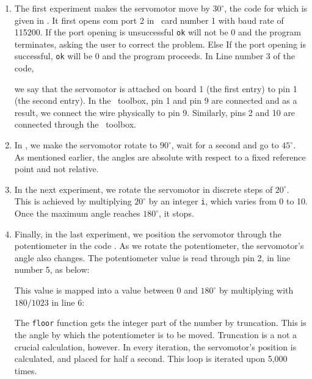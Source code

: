 \begin{enumerate}
  \item The first experiment makes the servomotor move by $30^\circ$,
        the code for which is given in .
        It first opens com port 2 in \arduino\ card number 1 with baud rate
        of 115200.  If the port opening is unsuccessful {\tt ok} will not be
        0 and the program terminates, asking the user to correct the
        problem.  Else If the port opening is successful, {\tt ok} will be 0
        and the program proceeds.  In Line number 3 of the code, \ie\
        
        we say that the servomotor is attached on board 1 (the first entry)
        to pin 1 (the second entry).  In the \scilab\ toolbox, pin 1 and pin
        9 are connected and as a result, we connect the wire physically to
        pin 9.  Similarly, pins 2 and 10 are connected through the
        \scilab\ toolbox.
        
  \item In , we make the servomotor rotate
        to $90^\circ$, wait for a second and go to $45^\circ$.  As mentioned
        earlier, the angles are absolute with respect to a fixed reference
        point and not relative.  
        
  \item In the next experiment, we rotate the servomotor in discrete
        steps of $20^\circ$.  This is achieved by multiplying $20^\circ$ by
        an integer {\tt i}, which varies from 0 to 10.  Once the maximum
        angle reaches $180^\circ$, it stops.  
        
  \item Finally, in the last experiment, we position the servomotor
        through the potentiometer in the code .  As we
        rotate the potentiometer, the servomotor's angle also changes.  The
        potentiometer value is read through pin 2, in line number 5, as
        below:
        
        This value is mapped into a value between 0 and $180^\circ$ by
        multiplying with $180/1023$ in line 6:
        
        The {\tt floor} function gets the integer part of the number by
        truncation.  This is the angle by which the potentiometer is to be
        moved.  Truncation is a not a crucial calculation, however.  In
        every iteration, the servomotor's position is calculated, and placed
        for half a second.  This loop is iterated upon 5,000 times.
\end{enumerate}

